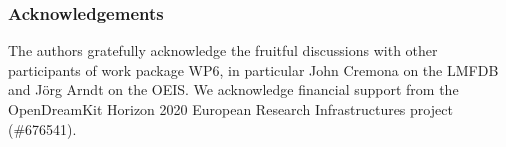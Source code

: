 \subsubsection*{Acknowledgements}
The authors gratefully acknowledge the fruitful discussions with other participants of
work package WP6, in particular John Cremona on the LMFDB and J\"org Arndt on the OEIS. We
acknowledge financial support from the OpenDreamKit Horizon 2020 European Research
Infrastructures project (\#676541).


